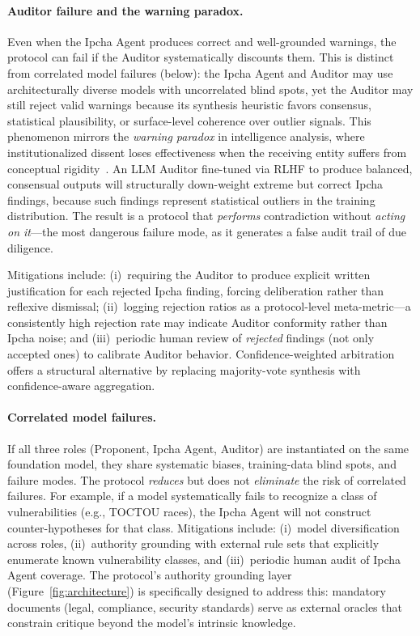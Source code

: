 \documentclass[11pt,a4paper]{article}
\begin{document}
\paragraph{Auditor failure and the warning paradox.}
Even when the Ipcha Agent produces correct and well-grounded warnings, the protocol can fail if the Auditor systematically discounts them.
This is distinct from correlated model failures (below): the Ipcha Agent and Auditor may use architecturally diverse models with uncorrelated blind spots, yet the Auditor may still reject valid warnings because its synthesis heuristic favors consensus, statistical plausibility, or surface-level coherence over outlier signals.
This phenomenon mirrors the \emph{warning paradox} in intelligence analysis, where institutionalized dissent loses effectiveness when the receiving entity suffers from conceptual rigidity~\cite{wynn2025}.
An LLM Auditor fine-tuned via RLHF to produce balanced, consensual outputs will structurally down-weight extreme but correct Ipcha findings, because such findings represent statistical outliers in the training distribution.
The result is a protocol that \emph{performs} contradiction without \emph{acting on it}---the most dangerous failure mode, as it generates a false audit trail of due diligence.

Mitigations include:
(i)~requiring the Auditor to produce explicit written justification for each rejected Ipcha finding, forcing deliberation rather than reflexive dismissal;
(ii)~logging rejection ratios as a protocol-level meta-metric---a consistently high rejection rate may indicate Auditor conformity rather than Ipcha noise; and
(iii)~periodic human review of \emph{rejected} findings (not only accepted ones) to calibrate Auditor behavior.
Confidence-weighted arbitration~\cite{confmad2025} offers a structural alternative by replacing majority-vote synthesis with confidence-aware aggregation.

\paragraph{Correlated model failures.}
If all three roles (Proponent, Ipcha Agent, Auditor) are instantiated on the same foundation model, they share systematic biases, training-data blind spots, and failure modes.
The protocol \emph{reduces} but does not \emph{eliminate} the risk of correlated failures.
For example, if a model systematically fails to recognize a class of vulnerabilities (e.g., TOCTOU races), the Ipcha Agent will not construct counter-hypotheses for that class.
Mitigations include: (i)~model diversification across roles, (ii)~authority grounding with external rule sets that explicitly enumerate known vulnerability classes, and (iii)~periodic human audit of Ipcha Agent coverage.
The protocol's authority grounding layer (Figure~\ref{fig:architecture}) is specifically designed to address this: mandatory documents (legal, compliance, security standards) serve as external oracles that constrain critique beyond the model's intrinsic knowledge.
\end{document}
